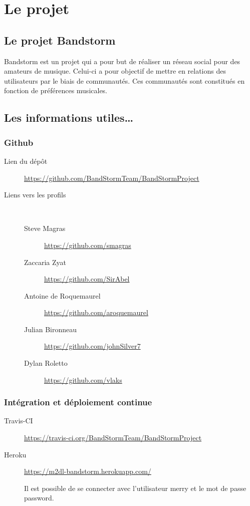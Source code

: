 \documentclass[12pt,a4paper,oneside]{book}
\begin{document}
	\thispagestyle{empty} %
	\titleBC

	\setcounter{tocdepth}{1}
	\setcounter{secnumdepth}{3}
	\setcounter{minitocdepth}{1}
	
	\tableofcontents
	\chapter{Le projet}
	\section{Le projet Bandstorm}
	Bandstorm est un projet qui a pour but de réaliser un réseau social pour des amateurs de musique. Celui-ci a pour objectif de mettre en relations des utilisateurs par le biais de communautés. Ces communautés sont constitués en fonction de préférences musicales.

	\section{Les informations utiles\ldots}
	\subsection{Github}
	\begin{description}
		\item[Lien du dépôt] \url{https://github.com/BandStormTeam/BandStormProject}~\\
		\item[Liens vers les profils]~
			\begin{description}
				\item[Steve Magras] \url{https://github.com/smagras}
				\item[Zaccaria Zyat] \url{https://github.com/SirAbel}
				\item[Antoine de Roquemaurel] \url{https://github.com/aroquemaurel}
				\item[Julian Bironneau] \url{https://github.com/johnSilver7}
				\item[Dylan Roletto] \url{https://github.com/vlaks} 
			\end{description}
	\end{description}

	\subsection{Intégration et déploiement continue}
	\begin{description}
		\item[Travis-CI] \url{https://travis-ci.org/BandStormTeam/BandStormProject }
		\item[Heroku] \url{https://m2dl-bandstorm.herokuapp.com/}~\\
			\begin{exemple}
				Il est possible de se connecter avec l'utilisateur merry et le mot de passe password.
			\end{exemple}
	\end{description}
\end{document}
